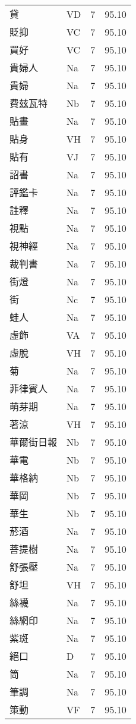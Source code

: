 \documentclass[twocolumn]{book}
\begin{document}
\begin{supertabular}{llrr}
貸 & VD & 7 &  95.10\\
貶抑 & VC & 7 &  95.10\\
買好 & VC & 7 &  95.10\\
貴婦人 & Na & 7 &  95.10\\
貴婦 & Na & 7 &  95.10\\
費玆瓦特 & Nb & 7 &  95.10\\
貼畫 & Na & 7 &  95.10\\
貼身 & VH & 7 &  95.10\\
貼有 & VJ & 7 &  95.10\\
詔書 & Na & 7 &  95.10\\
評鑑卡 & Na & 7 &  95.10\\
註釋 & Na & 7 &  95.10\\
視點 & Na & 7 &  95.10\\
視神經 & Na & 7 &  95.10\\
裁判書 & Na & 7 &  95.10\\
街燈 & Na & 7 &  95.10\\
街 & Nc & 7 &  95.10\\
蛙人 & Na & 7 &  95.10\\
虛飾 & VA & 7 &  95.10\\
虛脫 & VH & 7 &  95.10\\
菊 & Na & 7 &  95.10\\
菲律賓人 & Na & 7 &  95.10\\
萌芽期 & Na & 7 &  95.10\\
著涼 & VH & 7 &  95.10\\
華爾街日報 & Nb & 7 &  95.10\\
華電 & Nb & 7 &  95.10\\
華格納 & Nb & 7 &  95.10\\
華岡 & Nb & 7 &  95.10\\
華生 & Nb & 7 &  95.10\\
菸酒 & Na & 7 &  95.10\\
菩提樹 & Na & 7 &  95.10\\
舒張壓 & Na & 7 &  95.10\\
舒坦 & VH & 7 &  95.10\\
絲襪 & Na & 7 &  95.10\\
絲網印 & Na & 7 &  95.10\\
紫斑 & Na & 7 &  95.10\\
絕口 & D & 7 &  95.10\\
筒 & Na & 7 &  95.10\\
筆調 & Na & 7 &  95.10\\
策動 & VF & 7 &  95.10\\

\end{supertabular}
\end{document}
